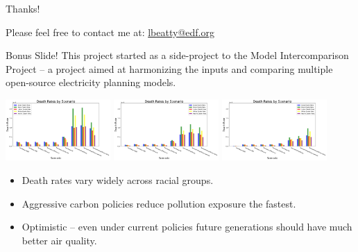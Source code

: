 \documentclass{beamer}
\begin{document}
\begin{frame}{Thanks!}
\label{Thanks}


    Please feel free to contact me at:
    \href{mailto:lbeatty@edf.org}{lbeatty@edf.org}\\
    \vspace{1cm}
\end{frame}

\begin{frame}{Bonus Slide!}
    This project started as a side-project to the Model Intercomparison Project -- a project aimed at harmonizing the inputs and comparing multiple open-source electricity planning models.

    \vspace{.4cm}
    
    \includegraphics[width=0.3\textwidth]{Figures/Output/ISRM_deathrate_by_scenario_2030.jpg}
    \includegraphics[width=0.3\textwidth]{Figures/Output/ISRM_deathrate_by_scenario_2040.jpg}
    \includegraphics[width=0.3\textwidth]{Figures/Output/ISRM_deathrate_by_scenario_2050.jpg}

\begin{itemize}
    \item Death rates vary widely across racial groups.
    \item Aggressive carbon policies reduce pollution exposure the fastest.
    \item Optimistic -- even under current policies future generations should have much better air quality.
\end{itemize}

\end{frame}
\end{document}

